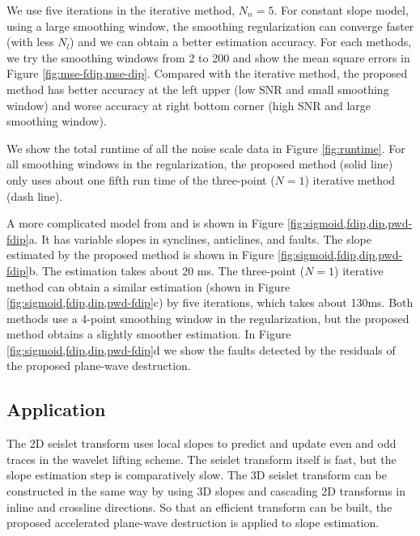 We use five iterations in the iterative method, $N_n=5$.
For constant slope model, using a large smoothing window,
the smoothing regularization can converge faster (with less $N_l$)
and we can obtain a better estimation accuracy.
For each methods, we try the smoothing windows from 2 to 200
and show the mean square errors in Figure \ref{fig:mse-fdip,mse-dip}.
Compared with the iterative method,
the proposed method has better accuracy 
at the left upper (low SNR and small smoothing window)
and worse accuracy at right bottom corner (high SNR and large smoothing window).

We show the total runtime of all the noise scale data in Figure \ref{fig:runtime}.
For all smoothing windows in the regularization,
the proposed method (solid line) only uses about one fifth run time
of the three-point ($N=1$) iterative method (dash line).


A more complicated model 
from \cite{claerbout1999geophysical} and \cite{fomel:1946}
is shown in Figure \ref{fig:sigmoid,fdip,dip,pwd-fdip}a.
It has variable slopes in synclines, anticlines, and faults.
The slope estimated by the proposed method is shown in 
Figure \ref{fig:sigmoid,fdip,dip,pwd-fdip}b.
The estimation takes about 20 ms.
The three-point ($N=1$) iterative method 
can obtain a similar estimation (shown in Figure \ref{fig:sigmoid,fdip,dip,pwd-fdip}c)
by five iterations, which takes about 130ms.
Both methods use a 4-point smoothing window in the regularization,
but the proposed method obtains a slightly smoother estimation.
In Figure \ref{fig:sigmoid,fdip,dip,pwd-fdip}d we show the faults 
detected by the residuals of the proposed plane-wave destruction.




\subsection{Application}



The 2D seislet transform \cite[]{fomel:V25}
uses local slopes to predict and update even and odd traces 
in the wavelet lifting scheme.
The seislet transform itself is fast, 
but the slope estimation step is comparatively slow.
The 3D seislet transform can be constructed in the same way by using 3D slopes 
and cascading 2D transforms in inline and crossline directions.
So that an efficient transform can be built, 
the proposed accelerated plane-wave destruction is applied to slope estimation.

